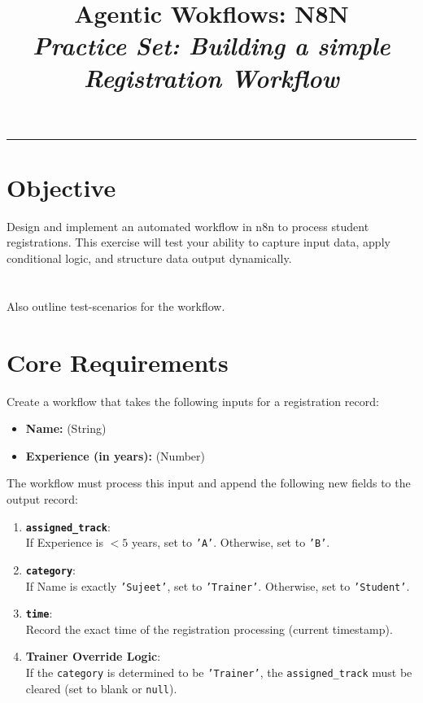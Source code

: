 \documentclass[11pt,a4paper]{article}
\title{\vspace{-2em}
\Huge \textbf{Agentic Wokflows: N8N} \\
\vspace{1em}
\large \textit{Practice Set: Building a simple Registration Workflow} 
}
\author{}
\date{}
\begin{document}
\maketitle
\vspace{-4em}
\hrule
\vspace{1.5em}

\section*{Objective}
Design and implement an automated workflow in n8n to process student registrations. This exercise will test your ability to capture input data, apply conditional logic, and structure data output dynamically.
\section*{}
Also outline test-scenarios for the workflow.

\section*{Core Requirements}
Create a workflow that takes the following inputs for a registration record:
\begin{itemize}
    \item \textbf{Name:} (String)
    \item \textbf{Experience (in years):} (Number)
\end{itemize}

The workflow must process this input and append the following new fields to the output record:
\begin{enumerate}
    \item \textbf{\texttt{assigned\_track}}:\\ If Experience is $< 5$ years, set to \texttt{'A'}. Otherwise, set to \texttt{'B'}.
    \item \textbf{\texttt{category}}:\\ If Name is exactly \texttt{'Sujeet'}, set to \texttt{'Trainer'}. Otherwise, set to \texttt{'Student'}.
    \item \textbf{\texttt{time}}:\\ Record the exact time of the registration processing (current timestamp).
    \item \textbf{Trainer Override Logic}:\\ If the \texttt{category} is determined to be \texttt{'Trainer'}, the \texttt{assigned\_track} must be cleared (set to blank or \texttt{null}).
\end{enumerate}
\end{document}
